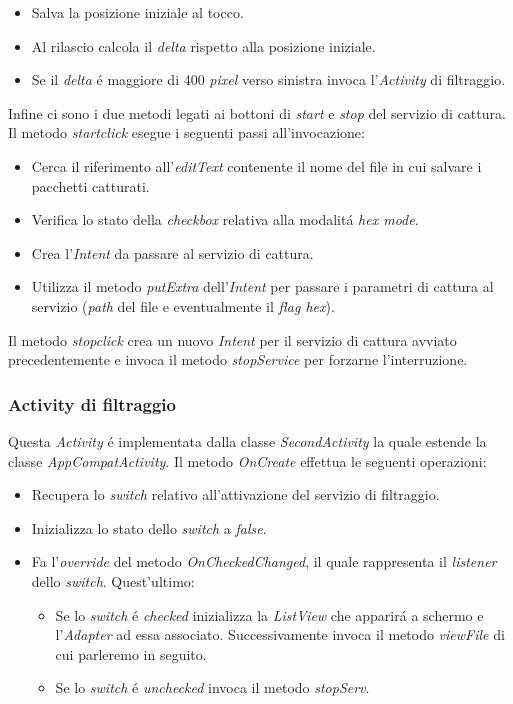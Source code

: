 \documentclass[12pt]{article} %
\begin{document}
\begin{itemize}
\item Salva la posizione iniziale al tocco.
\item Al rilascio calcola il \textit{delta} rispetto alla posizione iniziale.
\item Se il \textit{delta} \'e maggiore di 400 \textit{pixel} verso sinistra invoca l'\textit{Activity} di filtraggio.  
\end{itemize}

Infine ci sono i due metodi legati ai bottoni di \textit{start} e \textit{stop} del servizio di cattura. Il metodo \textit{startclick} esegue i seguenti passi all'invocazione:

\begin{itemize}
\item Cerca il riferimento all'\textit{editText} contenente il nome del file in cui salvare i pacchetti catturati.
\item Verifica lo stato della \textit{checkbox} relativa alla modalit\'a \textit{hex mode}.
\item Crea l'\textit{Intent} da passare al servizio di cattura.
\item Utilizza il metodo \textit{putExtra} dell'\textit{Intent} per passare i parametri di cattura al servizio (\textit{path} del file e eventualmente il \textit{flag hex}).
\end{itemize}

Il metodo \textit{stopclick} crea un nuovo \textit{Intent} per il servizio di cattura avviato precedentemente e invoca il metodo \textit{stopService} per forzarne l'interruzione.

\subsubsection{Activity di filtraggio}
Questa \textit{Activity} \'e implementata dalla classe \textit{SecondActivity} la quale estende la classe \textit{AppCompatActivity}. Il metodo \textit{OnCreate} effettua le seguenti operazioni:

\begin{itemize}
\item Recupera lo \textit{switch} relativo all'attivazione del servizio di filtraggio.
\item Inizializza lo stato dello \textit{switch} a \textit{false}.
\item Fa l'\textit{override} del metodo \textit{OnCheckedChanged}, il quale rappresenta il \textit{listener} dello \textit{switch}. Quest'ultimo:
\begin{itemize}
\item Se lo \textit{switch} \'e \textit{checked} inizializza la \textit{ListView} che apparir\'a a schermo e l'\textit{Adapter} ad essa associato. Successivamente invoca il metodo \textit{viewFile} di cui parleremo in seguito.
\item Se lo \textit{switch} \'e \textit{unchecked} invoca il metodo \textit{stopServ}.
\end{itemize}
\end{itemize}
\end{document}

